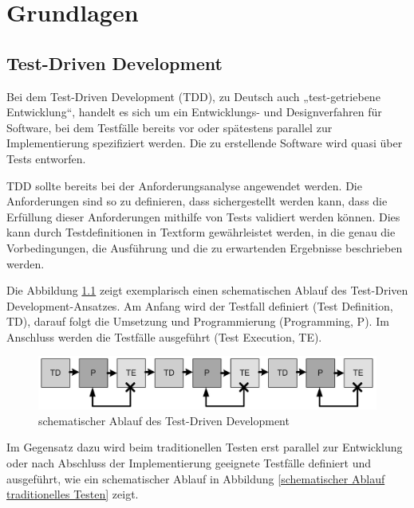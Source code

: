 \chapter{Grundlagen}
\section{Test-Driven Development}
Bei dem Test-Driven Development (TDD), zu Deutsch auch „test-getriebene Entwicklung“, handelt es sich um ein Entwicklungs- und Designverfahren für Software, bei dem Testfälle bereits vor oder spätestens parallel zur Implementierung spezifiziert werden. Die zu erstellende Software wird quasi über Tests entworfen. \cite[S. 151]{schatten_best_2010}

TDD sollte bereits bei der Anforderungsanalyse angewendet werden. Die Anforderungen sind so zu definieren, dass sichergestellt werden kann, dass die Erfüllung dieser Anforderungen mithilfe von Tests validiert werden können. Dies kann durch Testdefinitionen in Textform gewährleistet werden, in die genau die Vorbedingungen, die Ausführung und die zu erwartenden Ergebnisse beschrieben werden. \cite[S.188] {kleuker_qualitatssicherung_2019}

Die Abbildung \ref{schematischer Ablauf TDD} zeigt exemplarisch einen schematischen Ablauf des Test-Driven Development-Ansatzes. Am Anfang wird der Testfall definiert (Test Definition, TD), darauf folgt die Umsetzung und Programmierung (Programming, P). Im Anschluss werden die Testfälle ausgeführt (Test Execution, TE). \cite[S. 151]{schatten_best_2010}

\begin{figure}[h]
	\centering
	\includegraphics[clip,width=1\linewidth]{images/schematischer Ablauf TDD.jpg}
	\caption[schematischer Ablauf des Test-Driven Development]{schematischer Ablauf des Test-Driven Development \cite[S. 151]{schatten_best_2010}}
	\label{schematischer Ablauf TDD}
\end{figure}

Im Gegensatz dazu wird beim traditionellen Testen erst parallel zur Entwicklung oder nach Abschluss der Implementierung geeignete Testfälle definiert und ausgeführt, wie ein schematischer Ablauf in Abbildung \ref{schematischer Ablauf traditionelles Testen} zeigt. \cite[S. 150]{schatten_best_2010}

